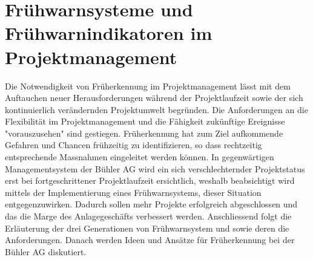\section{Frühwarnsysteme und Frühwarnindikatoren im Projektmanagement}\label{sec:vier}
Die Notwendigkeit von Früherkennung im Projektmanagement lässt mit dem Auftauchen neuer Herausforderungen während der Projektlaufzeit sowie der sich kontinuierlich verändernden Projektumwelt begründen. Die Anforderungen an die Flexibilität im Projektmanagement und die Fähigkeit zukünftige Ereignisse "vorauszusehen" sind gestiegen. Früherkennung hat zum Ziel aufkommende Gefahren und Chancen frühzeitig zu identifizieren, so dass rechtzeitig entsprechende Massnahmen eingeleitet werden können. In gegenwärtigen Managementsystem der Bühler AG wird ein sich verschlechternder Projektstatus erst bei fortgeschrittener Projektlaufzeit ersichtlich, weshalb beabsichtigt wird mittels der Implementierung eines Frühwarnsystems, dieser Situation entgegenzuwirken. Dadurch sollen mehr Projekte erfolgreich abgeschlossen und das die Marge des Anlagegeschäfts verbessert werden. Anschliessend folgt die Erläuterung der drei Generationen von Frühwarnsystem und sowie deren die Anforderungen. Danach werden Ideen und Ansätze für Früherkennung bei der Bühler AG diskutiert.
